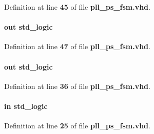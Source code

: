 Definition at line {\bf 45} of file {\bf pll\+\_\+ps\+\_\+fsm.\+vhd}.

\paragraph[{ps\+\_\+ctrl\+\_\+updown}]{ {\bfseries \textcolor{keywordflow}{out}\textcolor{vhdlchar}{ }} {\bfseries \textcolor{comment}{std\+\_\+logic}\textcolor{vhdlchar}{ }} \hspace{0.3cm}{\ttfamily [Port]}}\label{classpll__ps__fsm_abab40cfc2d89641cad385bce7a424dd2}


Definition at line {\bf 47} of file {\bf pll\+\_\+ps\+\_\+fsm.\+vhd}.

\paragraph[{ps\+\_\+done}]{ {\bfseries \textcolor{keywordflow}{out}\textcolor{vhdlchar}{ }} {\bfseries \textcolor{comment}{std\+\_\+logic}\textcolor{vhdlchar}{ }} \hspace{0.3cm}{\ttfamily [Port]}}\label{classpll__ps__fsm_a30b0d39bdafc8f9aac9749f9fe5070f9}


Definition at line {\bf 36} of file {\bf pll\+\_\+ps\+\_\+fsm.\+vhd}.

\paragraph[{ps\+\_\+en}]{ {\bfseries \textcolor{keywordflow}{in}\textcolor{vhdlchar}{ }} {\bfseries \textcolor{comment}{std\+\_\+logic}\textcolor{vhdlchar}{ }} \hspace{0.3cm}{\ttfamily [Port]}}\label{classpll__ps__fsm_aeb651745c857c378319a569e1aa0ffb1}


Definition at line {\bf 25} of file {\bf pll\+\_\+ps\+\_\+fsm.\+vhd}.

